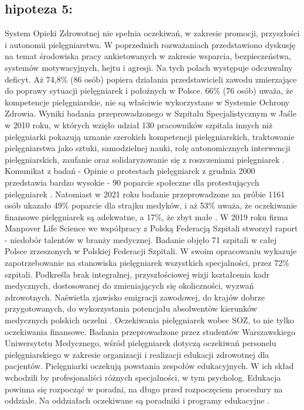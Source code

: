 \documentclass[a4paper,12pt,twoside,openright]{mwrep}
\begin{document}
\subsection*{hipoteza 5:} 
System Opieki Zdrowotnej nie spełnia oczekiwań, w zakresie promocji, przyszłości i autonomii pielęgniarstwa. W poprzednich rozważaniach przedstawiono dyskusję  na temat środowiska pracy ankietowanych w zakresie wsparcia, bezpieczeństwa, systemów motywacyjnych, hejtu  i agresji. Na tych polach występuje odczuwalny deficyt. Aż 74,8\%  (86 osób) popiera działania przedstawicieli zawodu zmierzające do poprawy sytuacji pielęgniarek i położnych w Polsce.  66\% (76 osób) uważa, że kompetencje pielęgniarskie, nie są właściwie wykorzystane w Systemie Ochrony Zdrowia. Wyniki badania przeprowadzonego w Szpitalu Specjalistycznym w Jaśle w 2010 roku, w których wzięło udział 130 pracowników szpitala innych niż pielęgniarki pokazują uznanie szerokich kompetencji pielęgniarskich, traktowanie pielęgniarstwa jako sztuki, samodzielnej nauki, rolę autonomicznych interwencji pielęgniarskich, zaufanie oraz solidaryzowanie się z roszczeniami pielęgniarek \cite{skorupska}. Komunikat z badań - Opinie o protestach pielęgniarek z grudnia 2000 przedstawia bardzo wysokie - 90  poparcie  społeczne dla protestujących pielęgniarek \cite{cebos}. Natomiast w 2021 roku badanie przeprowadzone na próbie 1161 osób ukazało 49\% poparcie dla strajku medyków, i aż 53\% uważa, że oczekiwanie finansowe pielęgniarek są adekwatne, a 17\%, że zbyt małe \cite{cebos2}. W 2019 roku firma Manpover Life Science we współpracy z Polską Federacją Szpitali stworzył raport - niedobór talentów w branży medycznej. Badanie objęło 71 szpitali w całej Polsce zrzeszonych w Polskiej Federacji Szpitali. W swoim opracowaniu wykazuje zapotrzebowanie na stanowiska pielęgniarek wszystkich specjalności, przez 72\% szpitali. Podkreśla brak integralnej, przyszłościowej wizji kształcenia kadr medycznych, dostosowanej do zmieniających się okoliczności, wyzwań zdrowotnych. Naświetla zjawisko emigracji zawodowej,  do krajów dobrze przygotowanych, do wykorzystania potencjału absolwentów kierunków medycznych polskich uczelni \cite{federacja}.
Oczekiwania pielęgniarek wobec SOZ, to nie tylko oczekiwania finansowe. Badania przeprowadzone przez studentów Warszawskiego Uniwersytetu Medycznego, wśród pielęgniarek dotyczą oczekiwań personelu pielęgniarskiego w zakresie organizacji i realizacji edukacji zdrowotnej dla pacjentów.  Pielęgniarki oczekują powstania zespołów edukacyjnych. W ich skład wchodzili by profesjonaliści różnych specjalności, w tym psycholog. Edukacja powinna się rozpocząć w poradni, na długo przed rozpoczęciem procedury na oddziale. Na oddziałach oczekiwane są poradniki i programy edukacyjne \cite{soz}.
\end{document}
